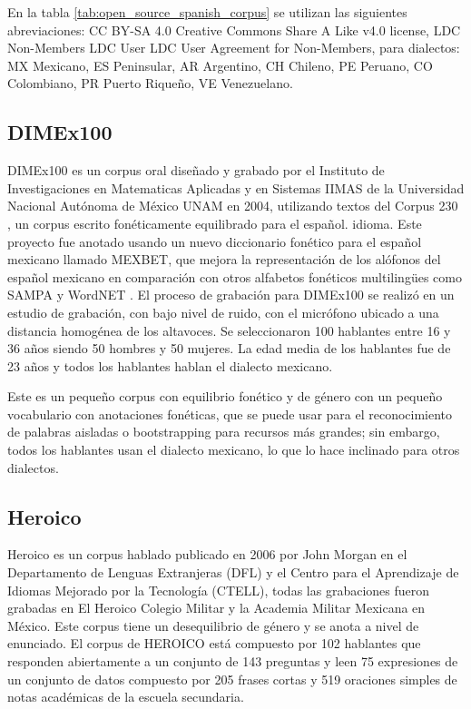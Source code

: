\documentclass[a4paper,12pt,twoside]{report}
\begin{document}
En la tabla \ref{tab:open_source_spanish_corpus} se utilizan las siguientes abreviaciones:  CC BY-SA 4.0 Creative Commons Share A Like v4.0 license, LDC Non-Members LDC User LDC User Agreement for Non-Members, para dialectos: MX Mexicano, ES Peninsular, AR Argentino, CH Chileno, PE Peruano, CO Colombiano, PR Puerto Riqueño, VE Venezuelano.



\subsection{DIMEx100}

DIMEx100 es un corpus oral diseñado y grabado por el Instituto de Investigaciones en Matematicas Aplicadas y en Sistemas IIMAS de la Universidad Nacional Autónoma de México UNAM en 2004, utilizando textos del Corpus 230 \cite{Corpus230}, un corpus escrito fonéticamente equilibrado para el español. idioma. Este proyecto fue anotado usando un nuevo diccionario fonético para el español mexicano llamado MEXBET, que mejora la representación de los alófonos del español mexicano en comparación con otros alfabetos fonéticos multilingües como SAMPA y WordNET \cite{mexbet}. El proceso de grabación para DIMEx100 se realizó en un estudio de grabación, con bajo nivel de ruido, con el micrófono ubicado a una distancia homogénea de los altavoces. Se seleccionaron 100 hablantes entre 16 y 36 años siendo 50 hombres y 50 mujeres. La edad media de los hablantes fue de 23 años y todos los hablantes hablan el dialecto mexicano.

Este es un pequeño corpus con equilibrio fonético y de género con un pequeño vocabulario con anotaciones fonéticas, que se puede usar para el reconocimiento de palabras aisladas o bootstrapping para recursos más grandes; sin embargo, todos los hablantes usan el dialecto mexicano, lo que lo hace inclinado para otros dialectos.

\subsection{Heroico}

Heroico es un corpus hablado publicado en 2006 por John Morgan en el Departamento de Lenguas Extranjeras (DFL) y el Centro para el Aprendizaje de Idiomas Mejorado por la Tecnología (CTELL), todas las grabaciones fueron grabadas en El Heroico Colegio Militar y la Academia Militar Mexicana en México. Este corpus tiene un desequilibrio de género y se anota a nivel de enunciado. El corpus de HEROICO está compuesto por 102 hablantes que responden abiertamente a un conjunto de 143 preguntas y leen 75 expresiones de un conjunto de datos compuesto por 205 frases cortas y 519 oraciones simples de notas académicas de la escuela secundaria.
\end{document}
